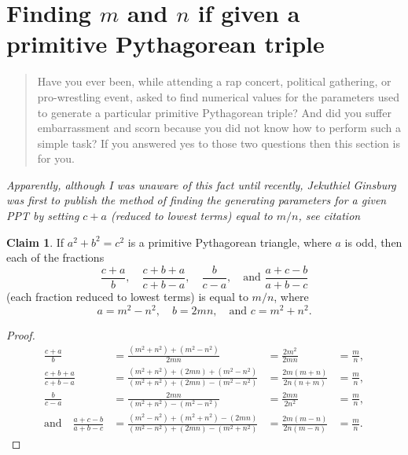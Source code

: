 \documentclass{article}
\theoremstyle{definition}
\newtheorem{claim}{Claim}
\begin{document}
\section{Finding \(m\) and \(n\) if given a primitive Pythagorean triple}
\label{sec:PPTmn}

\begin{quote}
\textsf{Have you ever been, while attending a rap concert, political gathering, or pro-wrestling event, asked to find numerical values for the parameters used to generate a particular primitive Pythagorean triple? And did you suffer embarrassment and scorn because you did not know how to perform such a simple task? If you answered yes to those two questions then this section is for you.}
\end{quote}

 \textit{Apparently, although I was unaware of this fact until recently, Jekuthiel Ginsburg was first to publish the method of finding the generating parameters for a given PPT by setting \(c+a\) (reduced to lowest terms) equal to \(m/n\), see citation} \cite[p.~188]{jg}

\begin{claim}
If \(a^2 + b^2 = c^2\) is a primitive Pythagorean triangle, where \(a\) is odd, then each of the fractions \[ \frac{c+a}{b}, \quad \frac{c+b+a}{c+b-a}, \quad
\frac{b}{c-a}, \quad \text{and } \frac{a+c-b}{a+b-c} \] (each fraction reduced to lowest terms) is equal to \(m/n\), where \[ a = m^2-n^2, \quad b = 2mn, \quad \text{and } c = m^2+n^2. \]
\end{claim}

\begin{proof}
\begin{align*}
\frac{c+a}{b} &= \frac{\left(m^2+n^2\right)+\left(m^2-n^2\right)}{2mn} &= \frac{2m^2}{2mn} &= \frac{m}{n}, \\
\frac{c+b+a}{c+b-a} &= \frac{\left(m^2+n^2\right)+(2mn)+\left(m^2-n^2\right)} {\left(m^2+n^2\right)+(2mn) - \left(m^2-n^2\right)} &= \frac{2m(m+n)}{2n(n+m)}&= \frac{m}{n}, \\
\frac{b}{c-a} &= \frac{2mn}{\left(m^2+n^2\right)-\left(m^2-n^2\right)} &= \frac{2mn}{2n^2} &= \frac{m}{n}, \\
\text{and} \quad \frac{a+c-b}{a+b-c} &=\frac{\left(m^2-n^2\right)+\left(m^2+n^2\right)-(2mn)}{\left(m^2-n^2\right)+(2mn)-\left(m^2+n^2\right)} &= \frac{2m(m-n)}{2n(m-n)} &= \frac{m}{n}.
\end{align*}
\end{proof}
\end{document}
